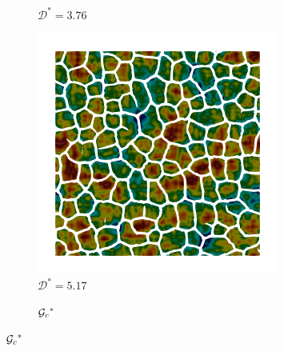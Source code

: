 \begin{figure}[!htbp]
\begin{subfigure}[b]{0.25\textwidth}
    \caption{$\mathcal{D}^* = 3.76$}
    \label{fig: Chapter4/2D/Gc_exp_cartesian_5_5_rho_0_seed_a_with_crack_160}
  \end{subfigure}
  \begin{subfigure}[b]{0.25\textwidth}
    \includegraphics[width=\textwidth]{Chapter4/figures/2D/Gc_exp_cartesian_5_5_rho_0_seed_b_with_crack_220.png}
    \caption{$\mathcal{D}^* = 5.17$}
    \label{fig: Chapter4/2D/Gc_exp_cartesian_5_5_rho_0_seed_a_with_crack_220}
  \end{subfigure}
  \begin{subfigure}[b]{0.08\textwidth}
    \caption*{${\mathcal{G}_c}^*$}

\end{subfigure}
\end{figure}
